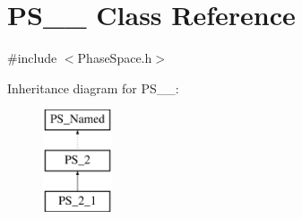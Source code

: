 \hypertarget{classPS__2__1}{\section{P\-S\-\_\-\_ Class Reference}
\label{classPS__2__1}
}


{\ttfamily \#include $<$Phase\-Space.\-h$>$}

Inheritance diagram for P\-S\-\_\-\_\-:\begin{figure}[H]
\begin{center}
\leavevmode
\includegraphics[height=3.000000cm]{classPS__2__1}
\end{center}
\end{figure}
